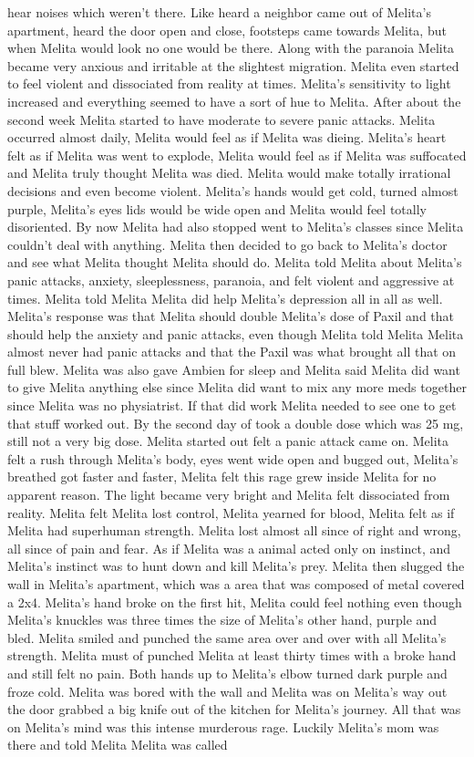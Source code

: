 \documentclass[12pt]{book}
\begin{document}
hear noises which weren't there. Like heard a neighbor came out of Melita's apartment, heard the door open and close, footsteps came towards Melita, but when Melita would look no one would be there. Along with the paranoia Melita became very anxious and irritable at the slightest migration. Melita even started to feel violent and dissociated from reality at times. Melita's sensitivity to light increased and everything seemed to have a sort of hue to Melita. After about the second week Melita started to have moderate to severe panic attacks. Melita occurred almost daily, Melita would feel as if Melita was dieing. Melita's heart felt as if Melita was went to explode, Melita would feel as if Melita was suffocated and Melita truly thought Melita was died. Melita would make totally irrational decisions and even become violent. Melita's hands would get cold, turned almost purple, Melita's eyes lids would be wide open and Melita would feel totally disoriented. By now Melita had also stopped went to Melita's classes since Melita couldn't deal with anything. Melita then decided to go back to Melita's doctor and see what Melita thought Melita should do. Melita told Melita about Melita's panic attacks, anxiety, sleeplessness, paranoia, and felt violent and aggressive at times. Melita told Melita Melita did help Melita's depression all in all as well. Melita's response was that Melita should double Melita's dose of Paxil and that should help the anxiety and panic attacks, even though Melita told Melita Melita almost never had panic attacks and that the Paxil was what brought all that on full blew. Melita was also gave Ambien for sleep and Melita said Melita did want to give Melita anything else since Melita did want to mix any more meds together since Melita was no physiatrist. If that did work Melita needed to see one to get that stuff worked out. By the second day of took a double dose which was 25 mg, still not a very big dose. Melita started out felt a panic attack came on. Melita felt a rush through Melita's body, eyes went wide open and bugged out, Melita's breathed got faster and faster, Melita felt this rage grew inside Melita for no apparent reason. The light became very bright and Melita felt dissociated from reality. Melita felt Melita lost control, Melita yearned for blood, Melita felt as if Melita had superhuman strength. Melita lost almost all since of right and wrong, all since of pain and fear. As if Melita was a animal acted only on instinct, and Melita's instinct was to hunt down and kill Melita's prey. Melita then slugged the wall in Melita's apartment, which was a area that was composed of metal covered a 2x4. Melita's hand broke on the first hit, Melita could feel nothing even though Melita's knuckles was three times the size of Melita's other hand, purple and bled. Melita smiled and punched the same area over and over with all Melita's strength. Melita must of punched Melita at least thirty times with a broke hand and still felt no pain. Both hands up to Melita's elbow turned dark purple and froze cold. Melita was bored with the wall and Melita was on Melita's way out the door grabbed a big knife out of the kitchen for Melita's journey. All that was on Melita's mind was this intense murderous rage. Luckily Melita's mom was there and told Melita Melita was called 
\end{document}
